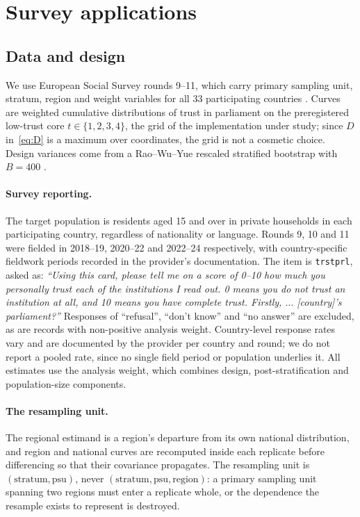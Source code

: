 \section{Survey applications}\label{sec:applications}

\subsection{Data and design}
We use European Social Survey rounds 9--11, which carry primary sampling unit,
stratum, region and weight variables for all 33 participating countries
\citep{essdata2024}. Curves are weighted cumulative distributions of trust in
parliament on the preregistered low-trust core $t\in\{1,2,3,4\}$, the grid of
the implementation under study; since $D$ in~\eqref{eq:D} is a maximum over
coordinates, the grid is not a cosmetic choice. Design variances come from a
Rao--Wu--Yue rescaled stratified bootstrap with $B=400$
\citep{rao1992recent,wolter2007introduction}.

\paragraph{Survey reporting.} The target population is residents aged 15 and
over in private households in each participating country, regardless of
nationality or language. Rounds 9, 10 and 11 were fielded in 2018--19,
2020--22 and 2022--24 respectively, with country-specific fieldwork periods
recorded in the provider's documentation. The item is \texttt{trstprl}, asked
as: \emph{``Using this card, please tell me on a score of 0--10 how much you
personally trust each of the institutions I read out. 0 means you do not trust
an institution at all, and 10 means you have complete trust. Firstly,
$\ldots$ [country]'s parliament?''} Responses of ``refusal'', ``don't know'' and
``no answer'' are excluded, as are records with non-positive analysis weight.
Country-level response rates vary and are documented by the provider per country
and round; we do not report a pooled rate, since no single field period or
population underlies it. All estimates use the analysis weight, which combines
design, post-stratification and population-size components.

\paragraph{The resampling unit.} The regional estimand is a region's departure
from its own national distribution, and region and national curves are
recomputed inside each replicate before differencing so that their covariance
propagates. The resampling unit is $(\text{stratum},\text{psu})$, never
$(\text{stratum},\text{psu},\text{region})$: a primary sampling unit spanning
two regions must enter a replicate whole, or the dependence the resample exists
to represent is destroyed.

